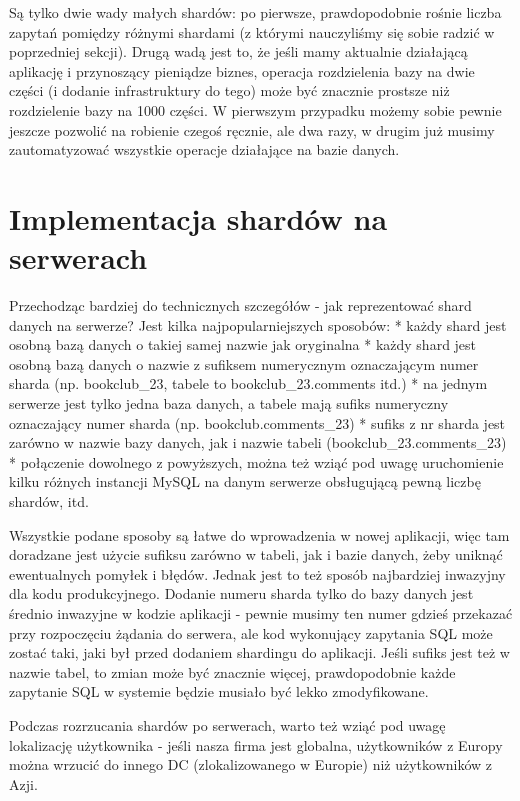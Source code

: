 \documentclass[a4paper,12pt]{article}
\begin{document}
Są tylko dwie wady małych shardów: po pierwsze, prawdopodobnie rośnie liczba zapytań pomiędzy różnymi shardami (z którymi nauczyliśmy się sobie radzić w poprzedniej sekcji). Drugą wadą jest to, że jeśli mamy aktualnie działającą aplikację i przynoszący pieniądze biznes, operacja rozdzielenia bazy na dwie części (i dodanie infrastruktury do tego) może być znacznie prostsze niż rozdzielenie bazy na 1000 części. W pierwszym przypadku możemy sobie pewnie jeszcze pozwolić na robienie czegoś ręcznie, ale dwa razy, w drugim już musimy zautomatyzować wszystkie operacje działające na bazie danych.

\section{Implementacja shardów na serwerach}

Przechodząc bardziej do technicznych szczegółów - jak reprezentować shard danych na serwerze? Jest kilka najpopularniejszych sposobów:
* każdy shard jest osobną bazą danych o takiej samej nazwie jak oryginalna
* każdy shard jest osobną bazą danych o nazwie z sufiksem numerycznym oznaczającym numer sharda (np. bookclub\_23, tabele to bookclub\_23.comments itd.)
* na jednym serwerze jest tylko jedna baza danych, a tabele mają sufiks numeryczny oznaczający numer sharda (np. bookclub.comments\_23)
* sufiks z nr sharda jest zarówno w nazwie bazy danych, jak i nazwie tabeli (bookclub\_23.comments\_23)
* połączenie dowolnego z powyższych, można też wziąć pod uwagę uruchomienie kilku różnych instancji MySQL na danym serwerze obsługującą pewną liczbę shardów, itd.

Wszystkie podane sposoby są łatwe do wprowadzenia w nowej aplikacji, więc tam doradzane jest użycie sufiksu zarówno w tabeli, jak i bazie danych, żeby uniknąć ewentualnych pomyłek i błędów. Jednak jest to też sposób najbardziej inwazyjny dla kodu produkcyjnego. Dodanie numeru sharda tylko do bazy danych jest średnio inwazyjne w kodzie aplikacji - pewnie musimy ten numer gdzieś przekazać przy rozpoczęciu żądania do serwera, ale kod wykonujący zapytania SQL może zostać taki, jaki był przed dodaniem shardingu do aplikacji. Jeśli sufiks jest też w nazwie tabel, to zmian może być znacznie więcej, prawdopodobnie każde zapytanie SQL w systemie będzie musiało być lekko zmodyfikowane.

Podczas rozrzucania shardów po serwerach, warto też wziąć pod uwagę lokalizację użytkownika - jeśli nasza firma jest globalna, użytkowników z Europy można wrzucić do innego DC (zlokalizowanego w Europie) niż użytkowników z Azji.
\end{document}
